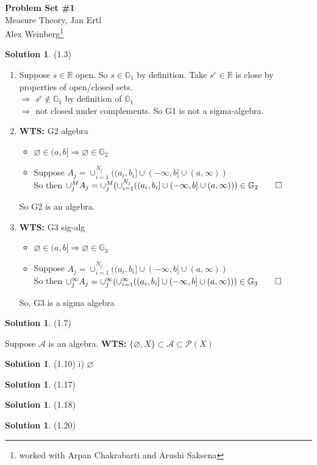 \documentclass[letterpaper,12pt]{article}
\theoremstyle{definition}
\newtheorem{solution}[theorem]{Solution}
\begin{document}
\begin{flushleft}
  \textbf{\large{Problem Set \#1}} \\
  Measure Theory, Jan Ertl \\
  Alex Weinberg\footnote{worked with Arpan Chakrabarti and Arushi Saksena}
\end{flushleft}

\vspace{5mm}

\begin{solution}(1.3)
  \begin{enumerate}
  \item
  Suppose $s \in \mathbb{R} $ open. So $s \in \mathbb{G}_1$ by definition. Take $s^c \in \mathbb{R}$ is close by properties of open/closed sets. \\
  $\Rightarrow$ $s^c \not \in \mathbb{G}_1$ by definition of $\mathbb{G}_1$ \\
  $\Rightarrow$ not closed under complements. So G1 is not a sigma-algebra.

  \item \textbf{WTS:} G2 algebra
  \begin{itemize}
  \item $\varnothing \in (a,b] \Rightarrow \varnothing \in \mathbb{G}_2 $
  \item Suppose $A_j = \cup_{i=1}^{N_j} ((a_i,b_i] \cup (-\infty,b] \cup (a,\infty))$ \\
  So then $\cup_j^M A_j = \cup_j^M (\cup_{i=1}^{N_j} ((a_i,b_i] \cup (-\infty,b] \cup (a,\infty))) \in \mathbb{G}_2 \qed$
  \end{itemize}
  So G2 is an algebra.

  \item \textbf{WTS:} G3 sig-alg
  \begin{itemize}
    \item $\varnothing \in (a,b] \Rightarrow \varnothing \in \mathbb{G}_3 $
    \item Suppose $A_j = \cup_{i=1}^{N_j} ((a_i,b_i] \cup (-\infty,b] \cup (a,\infty))$ \\
    So then $\cup_j^\infty A_j = \cup_j^\infty (\cup_{i=1}^{\infty} ((a_i,b_i] \cup (-\infty,b] \cup (a,\infty))) \in \mathbb{G}_3 \qed$
  \end{itemize}
  So, G3 is a sigma algebra
  \end{enumerate}
\end{solution}

\begin{solution} (1.7)

Suppose $\mathcal{A}$ is an algebra. \textbf{WTS:} $\{\varnothing,X\} \subset \mathcal{A} \subset \mathcal{P}(X)$
\end{solution}

\begin{solution} (1.10)
i) $\varnothing$
\end{solution}

\begin{solution} (1.17)
\end{solution}
\begin{solution} (1.18)
\end{solution}
\begin{solution} (1.20)
\end{solution}
\end{document}
